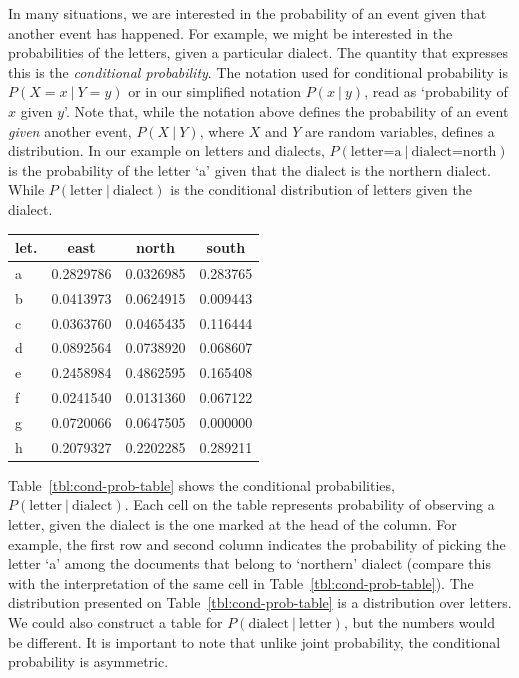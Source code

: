 In many situations,
we are interested in the probability of an event
given that another event has happened.
For example,
we might be interested in the probabilities of the letters,
given a particular dialect.
The quantity that expresses this is the \emph{conditional probability}.
The notation used for conditional probability is $P(X=x\:\vert\:Y=y)$
or in our simplified notation $P(x \:\vert\: y)$,
read as `probability of $x$ given $y$'.
Note that,
while the notation above defines the probability of an event
\emph{given} another event,
$P(X\:\vert\:Y)$, where $X$ and $Y$ are random variables,
defines a distribution.
In our example on letters and dialects,
$P(\text{letter=a}\:\vert\:\text{dialect=north})$ is
the probability of the letter `a' given that
the dialect is the northern dialect.
While $P(\text{letter}\:\vert\:\text{dialect})$
is the conditional distribution of letters given the dialect.
\begin{margintable}
  \caption{\label{tbl:cond-prob-table}%
    Conditional probabilities of $P(\text{letter}\:\vert\:\text{dialect})$.
  }
  \begin{center}
    \setlength{\tabcolsep}{4pt}
    \begin{tabular}{lS[round-precision=3]S[round-precision=3]S[round-precision=3]}
      \toprule
      let. & {east} & {north} & {south} \\
      \midrule
      a & 0.2829786& 0.0326985& 0.283765\\
      b & 0.0413973& 0.0624915& 0.009443\\
      c & 0.0363760& 0.0465435& 0.116444\\
      d & 0.0892564& 0.0738920& 0.068607\\
      e & 0.2458984& 0.4862595& 0.165408\\
      f & 0.0241540& 0.0131360& 0.067122\\
      g & 0.0720066& 0.0647505& 0.000000\\
      h & 0.2079327& 0.2202285& 0.289211\\
      \bottomrule
    \end{tabular}
  \end{center}
\end{margintable}
Table~\ref{tbl:cond-prob-table} shows the conditional probabilities,
$P(\text{letter}\:\vert\:\text{dialect})$.
Each cell on the table represents probability of observing a letter,
given the dialect is the one marked at the head of the column.
For example, 
the first row and second column indicates the probability of
picking the letter `a'
among the documents that belong to `northern' dialect
(compare this with the interpretation of the same cell
in Table~\ref{tbl:cond-prob-table}).
The distribution presented on Table~\ref{tbl:cond-prob-table} is
a distribution over letters.
We could also construct a table for 
$P(\text{dialect}\:\vert\:\text{letter})$,
but the numbers would be different.
It is important to note that unlike joint probability,
the conditional probability is asymmetric.

